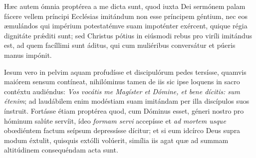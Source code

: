 {\noindent Hæc autem ómnia proptérea a me dicta sunt, quod iuxta Dei sermónem palam fácere vellem príncipi Ecclésias imitándum non esse príncipem géntium, nec eos æmulándos qui impérium potestatémve suam impoténter exércent, quique régia dignitáte pr\'{æ}diti sunt; sed Christus pótius in eiúsmodi rebus pro viríli imitándus est, ad quem facíllimi sunt áditus, qui cum muliéribus conversátur et púeris manus impónit.

\noindent Iesum vero in pelvim aquam profudísse et discipulórum pedes tersísse, quamvis maiórem sensum contíneat, nihilóminus tamen de iis sic ipse loquens in sacro contéxtu audiéndus: \emph{Vos vocátis me Magíster et Dómine, et bene dícitis: sum étenim}; ad laudábilem enim modéstiam suam imitándam per illa discípulos suos ínstruit. Fortásse étiam proptérea quod, cum Dóminus esset, géneri nostro pro hóminum salúte servíit, ídeo \emph{formam servi} accepísse et \emph{ad mortem usque} obœdiéntem factum seípsum depressísse dícitur; et si eum idcírco Deus supra modum éxtulit, quisquis extólli volúerit, simília iis agat quæ ad summam altitúdinem consequéndam acta sunt.

\vfill
\pagebreak

 

\vspace{-5mm}


\vfill
\pagebreak
}
\newcommand{\responsoriumbreve}{\pars{Responsorium breve.}

\cuminitiali{VI}{temporalia/resp-christefilidei.gtex}}
\newcommand{\benedictus}{\pars{Canticum Zachariæ.} \scriptura{Mt. 20, 23; \textbf{H152}}

\vspace{-4mm}

\antiphona{VII a}{temporalia/ant-sedereautemmecum.gtex}

\vspace{-2mm}

\scriptura{Lc. 1, 68-79}

\vspace{-2mm}

\cantusSineNeumas
\initiumpsalmi{temporalia/benedictus-initium-viisoll-a-auto.gtex}


 \Abardot{}}


